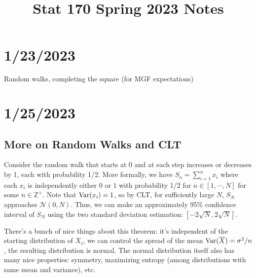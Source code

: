 \documentclass[12pt]{report}
\title{Stat 170 Spring 2023 Notes}
\author{}
\date{}
\begin{document}
\maketitle
\tableofcontents

\chapter{1/23/2023}
Random walks, completing the square (for MGF expectations)

\chapter{1/25/2023}
\section{More on Random Walks and CLT}
Consider the random walk that starts at 0 and at each step increases or decreases by 1, each with probability 1/2. More formally, we have $S_n=\sum_{i=1}^n x_i$ where each $x_i$ is independently either $0$ or $1$ with probability 1/2 for $n\in[1,\cdots,N]$ for some $n\in\mathbb Z^+$. Note that $\operatorname{Var}(x_i)=1$, so by CLT, for sufficiently large $N$, $S_N$ approaches $\mathcal N(0,N)$. Thus, we can make an approximately 95\% confidence interval of $S_N$ using the two standard deviation estimation: $[-2\sqrt N, 2\sqrt N]$.

There's a bunch of nice things about this theorem: it's independent of the starting distribution of $X_i$, we can control the spread of the mean $\operatorname{Var}(\overline X)=\sigma^2/n$, the resulting distribution is normal. The normal distribution itself also has many nice properties: symmetry, maximizing entropy (among distributions with same mean and variance), etc.
\end{document}
